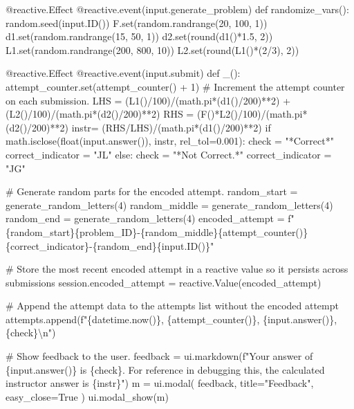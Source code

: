 \documentclass[
  letterpaper,
  DIV=11,
  numbers=noendperiod]{scrreprt}
\newenvironment{Shaded}{\begin{snugshade}}{\end{snugshade}}
\newcommand{\NormalTok}[1]{\textcolor[rgb]{0.00,0.23,0.31}{#1}}
\begin{document}
\begin{Shaded}
\begin{Highlighting}[]
\NormalTok{    @reactive.Effect}
\NormalTok{    @reactive.event(input.generate\_problem)}
\NormalTok{    def randomize\_vars():}
\NormalTok{        random.seed(input.ID())}
\NormalTok{        F.set(random.randrange(20, 100, 1))}
\NormalTok{        d1.set(random.randrange(15, 50, 1))}
\NormalTok{        d2.set(round(d1()*1.5, 2))}
\NormalTok{        L1.set(random.randrange(200, 800, 10))}
\NormalTok{        L2.set(round(L1()*(2/3), 2))}
       
        
\NormalTok{    @reactive.Effect}
\NormalTok{    @reactive.event(input.submit)}
\NormalTok{    def \_():}
\NormalTok{        attempt\_counter.set(attempt\_counter() + 1)  \# Increment the attempt counter on each submission.}
\NormalTok{        LHS = (L1()/100)/(math.pi*(d1()/200)**2) + (L2()/100)/(math.pi*(d2()/200)**2)}
\NormalTok{        RHS = (F()*L2()/100)/(math.pi*(d2()/200)**2)}
\NormalTok{        instr= (RHS/LHS)/(math.pi*(d1()/200)**2)}
\NormalTok{        if math.isclose(float(input.answer()), instr, rel\_tol=0.001):}
\NormalTok{            check = "*Correct*"}
\NormalTok{            correct\_indicator = "JL"}
\NormalTok{        else:}
\NormalTok{            check = "*Not Correct.*"}
\NormalTok{            correct\_indicator = "JG"}

\NormalTok{        \# Generate random parts for the encoded attempt.}
\NormalTok{        random\_start = generate\_random\_letters(4)}
\NormalTok{        random\_middle = generate\_random\_letters(4)}
\NormalTok{        random\_end = generate\_random\_letters(4)}
\NormalTok{        encoded\_attempt = f"\{random\_start\}\{problem\_ID\}{-}\{random\_middle\}\{attempt\_counter()\}\{correct\_indicator\}{-}\{random\_end\}\{input.ID()\}"}

\NormalTok{        \# Store the most recent encoded attempt in a reactive value so it persists across submissions}
\NormalTok{        session.encoded\_attempt = reactive.Value(encoded\_attempt)}

\NormalTok{        \# Append the attempt data to the attempts list without the encoded attempt}
\NormalTok{        attempts.append(f"\{datetime.now()\}, \{attempt\_counter()\}, \{input.answer()\}, \{check\}\textbackslash{}n")}

\NormalTok{        \# Show feedback to the user.}
\NormalTok{        feedback = ui.markdown(f"Your answer of \{input.answer()\} is \{check\}. For reference in debugging this, the calculated instructor answer is \{instr\}")}
\NormalTok{        m = ui.modal(}
\NormalTok{            feedback,}
\NormalTok{            title="Feedback",}
\NormalTok{            easy\_close=True}
\NormalTok{        )}
\NormalTok{        ui.modal\_show(m)}


\end{Highlighting}
\end{Shaded}
\end{document}
